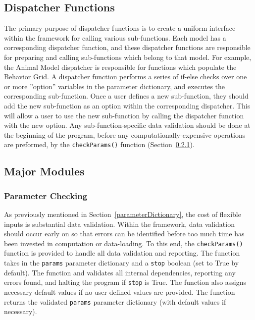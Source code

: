 \subsection{Dispatcher Functions}
\label{dispatcherFunctions}
The primary purpose of dispatcher functions is to create a uniform interface within the framework for calling various sub-functions.  Each model has a corresponding dispatcher function, and these dispatcher functions are responsible for preparing and calling sub-functions which belong to that model.  For example, the Animal Model dispatcher is responsible for functions which populate the Behavior Grid.  A dispatcher function performs a series of if-else checks over one or more ''option'' variables in the parameter dictionary, and executes the corresponding sub-function.  Once a user defines a new sub-function, they should add the new sub-function as an option within the corresponding dispatcher.  This will allow a user to use the new sub-function by calling the dispatcher function with the new option.  Any sub-function-specific data validation should be done at the beginning of the program, before any computationally-expensive operations are preformed, by the \texttt{checkParams()} function (Section~\ref{checkParams}).


\subsection{Major Modules}
\label{majorModules}
\subsubsection{Parameter Checking}
\label{checkParams}
As previously mentioned in Section~\ref{parameterDictionary}, the cost of flexible inputs is substantial data validation.  Within the framework, data validation should occur early on so that errors can be identified before too much time has been invested in computation or data-loading.  To this end, the \texttt{checkParams()} function is provided to handle all data validation and reporting.  The function takes in the \texttt{params} parameter dictionary and a \texttt{stop} boolean (set to True by default).  The function and validates all internal dependencies, reporting any errors found, and halting the program if \texttt{stop} is True.  The function also assigns necessary default values if no user-defined values are provided.  The function returns the validated \texttt{params} parameter dictionary (with default values if necessary).  

